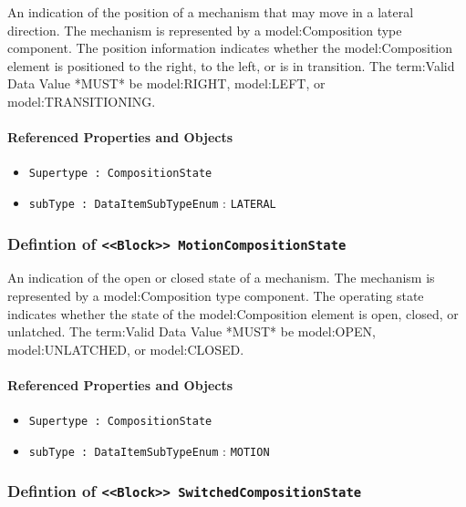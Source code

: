 \FloatBarrier

An indication of the position of a mechanism that may move in a lateral direction.   The mechanism is represented by a {model:Composition} type component. 
 The position information indicates whether the {model:Composition} element is positioned to the right, to the left, or is in transition.  
 The {term:Valid Data Value} *MUST* be {model:RIGHT}, {model:LEFT}, or {model:TRANSITIONING}.

\FloatBarrier
\paragraph{Referenced Properties and Objects}

\begin{itemize}
\item \texttt{Supertype : CompositionState}

\item \texttt{subType : DataItemSubTypeEnum} : \texttt{LATERAL}

\end{itemize}
\FloatBarrier
\subsubsection{Defintion of \texttt{<<Block>> MotionCompositionState}}
  \label{type:MotionCompositionState}

\FloatBarrier

An indication of the open or closed state of a mechanism.   The mechanism is represented by a {model:Composition} type component. 
 The operating state indicates whether the state of the {model:Composition} element is open, closed, or unlatched.   
 The {term:Valid Data Value} *MUST* be {model:OPEN}, {model:UNLATCHED}, or {model:CLOSED}.

\FloatBarrier
\paragraph{Referenced Properties and Objects}

\begin{itemize}
\item \texttt{Supertype : CompositionState}

\item \texttt{subType : DataItemSubTypeEnum} : \texttt{MOTION}

\end{itemize}
\FloatBarrier
\subsubsection{Defintion of \texttt{<<Block>> SwitchedCompositionState}}
  \label{type:SwitchedCompositionState}

